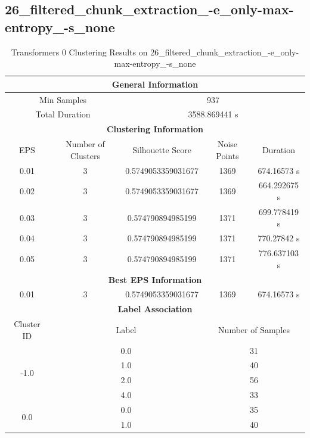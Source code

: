 \subsection{26\_filtered\_chunk\_extraction\_-e\_only-max-entropy\_-s\_none}

\begin{longtable}{|c|c|c|c|c|}
\caption{Transformers 0 Clustering Results on 26\_filtered\_chunk\_extraction\_-e\_only-max-entropy\_-s\_none} \label{tab:26_filtered_chunk_extraction_-e_only-max-entropy_-s_none_transformers_0_clustering_results}\\
\hline
\multicolumn{5}{|c|}{\textbf{General Information}} \\
\hline
\multicolumn{2}{|c|}{Min Samples} & \multicolumn{3}{c|}{937} \\
\multicolumn{2}{|c|}{Total Duration} & \multicolumn{3}{c|}{3588.869441 s} \\
\hline
\multicolumn{5}{|c|}{\textbf{Clustering Information}} \\
\hline
EPS & Number of Clusters & Silhouette Score & Noise Points & Duration \\
0.01 & 3 & 0.5749053359031677 & 1369 & 674.16573 s\\
0.02 & 3 & 0.5749053359031677 & 1369 & 664.292675 s\\
0.03 & 3 & 0.574790894985199 & 1371 & 699.778419 s\\
0.04 & 3 & 0.574790894985199 & 1371 & 770.27842 s\\
0.05 & 3 & 0.574790894985199 & 1371 & 776.637103 s\\
\hline
\multicolumn{5}{|c|}{\textbf{Best EPS Information}} \\
\hline
0.01 & 3 & 0.5749053359031677 & 1369 & 674.16573 s\\
\hline
\multicolumn{5}{|c|}{\textbf{Label Association}} \\
\hline
Cluster ID & \multicolumn{2}{c|}{Label} & \multicolumn{2}{c|}{Number of Samples} \\
\hline
\multirow{4}{*}{-1.0} & \multicolumn{2}{c|}{0.0} & \multicolumn{2}{c|}{31} \\
& \multicolumn{2}{c|}{1.0} & \multicolumn{2}{c|}{40} \\
& \multicolumn{2}{c|}{2.0} & \multicolumn{2}{c|}{56} \\
& \multicolumn{2}{c|}{4.0} & \multicolumn{2}{c|}{33} \\
\hline
\multirow{4}{*}{0.0} & \multicolumn{2}{c|}{0.0} & \multicolumn{2}{c|}{35} \\
& \multicolumn{2}{c|}{1.0} & \multicolumn{2}{c|}{40} \\

\end{longtable}
